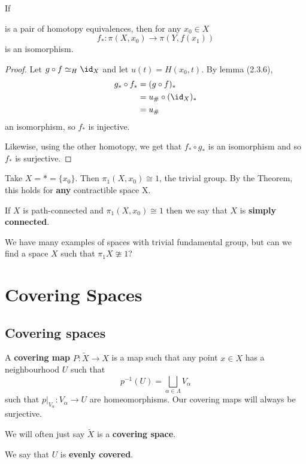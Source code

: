 \documentclass{article}
\numberwithin{nthm}{subsection}
\begin{document}
\begin{thm}
    If
    is a pair of homotopy equivalences, then for any $x_0 \in X$
    \begin{equation*}
        f_*: \pi(X, x_0) \to \pi(Y, f(x_1))
    \end{equation*}
    is an isomorphism.
\end{thm}

\begin{proof}
    Let $g \circ f \simeq_H \id_X$ and let $u(t) = H(x_0, t)$. By lemma (2.3.6),
    \begin{align*}
        g_* \circ f_* &= (g \circ f)_* \\
                      &= u_{\#} \circ (\id_X)_* \\
                      &= u_{\#}
    \end{align*}
    an isomorphism, so $f_*$ is injective.

    Likewise, using the other homotopy, we get that $f_* \circ g_*$ is an isomorphism and so $f_*$ is surjective.
\end{proof}

\begin{eg}
    Take $X = * = \{x_0\}$. Then $\pi_1(X, x_0) \cong 1$, the trivial group.  By the Theorem, this holds for \textbf{any} contractible space X.
\end{eg}

\begin{defi}
    If $X$ is path-connected and $\pi_1(X, x_0) \cong 1$ then we say that $X$ is \textbf{simply connected}.
\end{defi}

We have many examples of spaces with trivial fundamental group, but can we find a space $X$ such that $\pi_1 X \ncong 1$?

\clearpage
\section{Covering Spaces}

\subsection{Covering spaces}

\begin{ndef}
    A \textbf{covering map} $P: \widetilde{X} \to X$ is a map such that any point $x \in X$ has a neighbourhood $U$ such that
    \begin{equation*}
        p^{-1}(U) = \bigsqcup_{\alpha \in \Lambda} V_\alpha
    \end{equation*}
    such that $p|_{V_\alpha}: V_\alpha \to U$ are homeomorphisms. Our covering maps will always be surjective.

    We will often just say $\widetilde{X}$ is a \textbf{covering space}.

    We say that $U$ is \textbf{evenly covered}.
\end{ndef}
\end{document}
